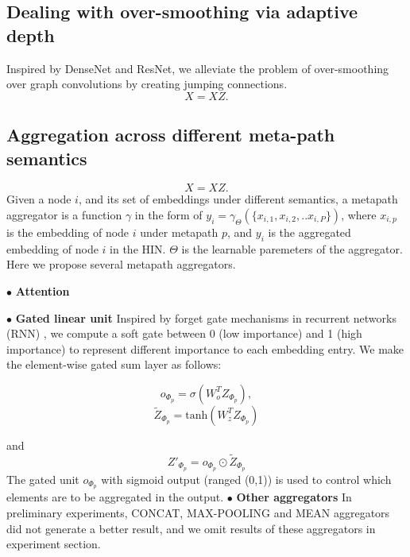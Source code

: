 \subsection{Dealing with over-smoothing via adaptive depth}
Inspired by DenseNet and ResNet, we alleviate the problem of over-smoothing over graph convolutions by creating jumping connections.
\begin{equation}
\label{eq:update_edge}
X = XZ.
\end{equation} 

\subsection{Aggregation across different meta-path semantics}
\begin{equation}
\label{eq:update_edge}
X = XZ.
\end{equation}
Given a node $i$, and its set of embeddings under different semantics, a metapath aggregator is a function $\gamma$ in the form of $y_i = \gamma_\Theta(\{x_{i,1},x_{i,2},..x_{i,P}\})$, where $x_{i,p}$ is the embedding of node $i$ under metapath $p$, and $y_i$ is the aggregated embedding of node $i$ in the HIN. $\Theta$ is the learnable paremeters of the aggregator.
Here we propose several metapath aggregators. 

$\bullet$ \textbf{Attention}

$\bullet$ \textbf{Gated linear unit}
Inspired by forget gate mechanisms in recurrent networks (RNN) , we compute a soft gate between 0 (low importance) and 1 (high importance) to represent different importance to each embedding entry.
We make the element-wise gated sum layer as follows:
\begin{multicols}{2}
\begin{equation*}
o_{\Phi_p}=\sigma(W_o^T Z_{\Phi_p}),
\end{equation*}\break
\begin{equation*}
\tilde{Z}_{\Phi_p}=\text{tanh}(W_z^T Z_{\Phi_p})
\end{equation*}
\end{multicols}
and 
\begin{equation}
\label{eq:mp_attn}
Z'_{\Phi_p}= o_{\Phi_p}\odot \tilde{Z}_{\Phi_p}
\end{equation}
The gated unit $o_{\Phi_p}$ with sigmoid output (ranged (0,1)) is used to control which elements are to be aggregated in the output.  
$\bullet$ \textbf{Other aggregators}
In preliminary experiments, CONCAT, MAX-POOLING and MEAN aggregators did not generate a better result, and we omit results of these aggregators in experiment section.

